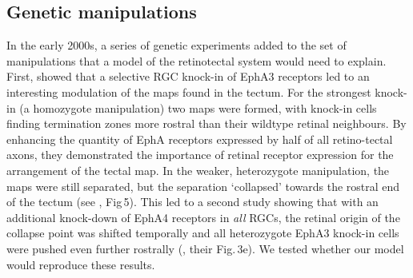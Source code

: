 \documentclass[11pt, a4paper]{article}
\begin{document}
\subsection*{Genetic manipulations}

In the early 2000s, a series of genetic experiments added to the set of manipulations that a model of the retinotectal system would need to
explain.
First, \citet{brown_topographic_2000} showed that a selective RGC knock-in of EphA3 receptors led to an interesting modulation of the maps found in the tectum.
For the strongest knock-in (a homozygote manipulation) two maps were formed, with knock-in cells finding termination zones more rostral than their wildtype retinal neighbours.
By enhancing the quantity of EphA receptors expressed by half of all retino-tectal axons, they demonstrated the importance of retinal receptor expression for the arrangement of the tectal map.
In the weaker, heterozygote manipulation, the maps were still separated, but the separation `collapsed' towards the rostral end of the tectum (see \citet{brown_topographic_2000}, Fig\,5).
This led to a second study showing that with an additional knock-down of EphA4 receptors in \emph{all} RGCs, the retinal origin of the collapse point was shifted temporally and all heterozygote EphA3 knock-in cells were pushed even further rostrally (\citet{reber_relative_2004}, their Fig.\,3e).
We tested whether our model would reproduce these results.
\end{document}
